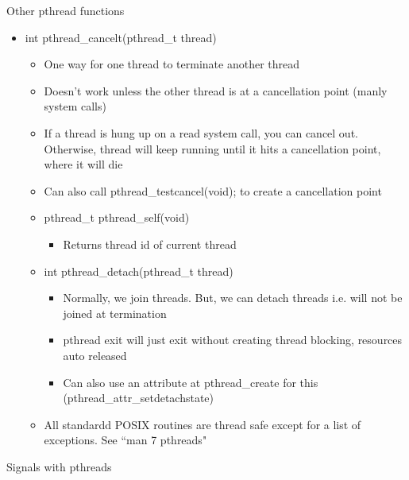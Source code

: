 Other pthread functions
\begin{itemize}
    \item int pthread\_cancelt(pthread\_t thread)
    \begin{itemize}
        \item One way for one thread to terminate another thread
        \item Doesn't work unless the other thread is at a cancellation point (manly system calls)
        \item If a thread is hung up on a read system call, you can cancel out. Otherwise, thread will keep running until it hits a cancellation point, where it will die
        \item Can also call pthread\_testcancel(void); to create a cancellation point
        \item pthread\_t pthread\_self(void)
        \begin{itemize}
            \item Returns thread id of current thread
        \end{itemize}
        \item int pthread\_detach(pthread\_t thread)
        \begin{itemize}
            \item Normally, we join threads. But, we can detach threads i.e. will not be joined at termination
            \item pthread exit will just exit without creating thread blocking, resources auto released
            \item Can also use an attribute at pthread\_create for this (pthread\_attr\_setdetachstate)
        \end{itemize}
        \item All standardd POSIX routines are thread safe except for a list of exceptions. See ``man 7 pthreads"
    \end{itemize}
\end{itemize}
Signals with pthreads
